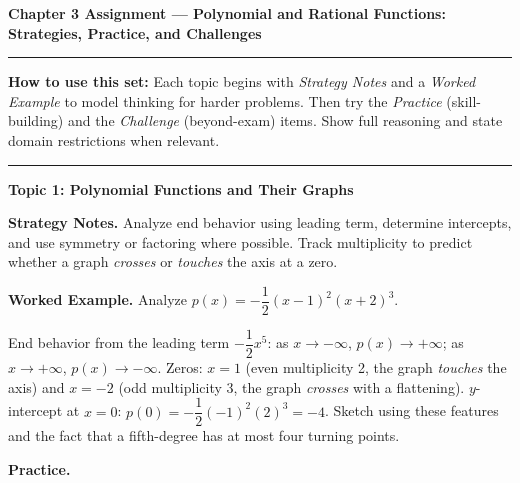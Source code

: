 \documentclass[12pt]{exam}
\newcommand{\examtitle}{Chapter 3 Assignment --- Polynomial and Rational Functions: Strategies, Practice, and Challenges}
\newcommand{\instructions}{
    \noindent\rule{\textwidth}{0.5pt}
    \begin{center}
    \textbf{How to use this set:} Each topic begins with \emph{Strategy Notes} and a \emph{Worked Example} to model thinking for harder problems. Then try the \emph{Practice} (skill-building) and the \emph{Challenge} (beyond-exam) items. Show full reasoning and state domain restrictions when relevant.
    \end{center}
    \noindent\rule{\textwidth}{0.5pt}
}
\begin{document}
\begin{center}
\textbf{\Large \examtitle} \\
\vspace{0.5cm}
\hspace{0.1\textwidth}
\end{center}

\instructions
\vspace{0.5cm}

\begin{questions}

\question
\textbf{Topic 1: Polynomial Functions and Their Graphs}

\textbf{Strategy Notes.} Analyze end behavior using leading term, determine intercepts, and use symmetry or factoring where possible. Track multiplicity to predict whether a graph \emph{crosses} or \emph{touches} the axis at a zero.

\textbf{Worked Example.} Analyze $p(x)=-\dfrac{1}{2}(x-1)^2(x+2)^3$.

End behavior from the leading term $-\dfrac{1}{2}x^5$: as $x\to-\infty$, $p(x)\to+\infty$; as $x\to+\infty$, $p(x)\to-\infty$. Zeros: $x=1$ (even multiplicity 2, the graph \emph{touches} the axis) and $x=-2$ (odd multiplicity 3, the graph \emph{crosses} with a flattening). $y$-intercept at $x=0$: $p(0)=-\dfrac{1}{2}( -1)^2(2)^3=-4$. Sketch using these features and the fact that a fifth-degree has at most four turning points.

\vspace{0.2cm}
\textbf{Practice.}


\end{questions}
\end{document}
